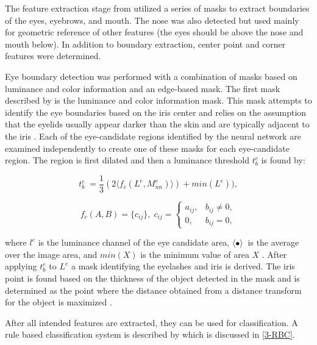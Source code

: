 The feature extraction stage from \cite{ioannou2007robust} utilized a series of masks to extract boundaries of the eyes, eyebrows, and mouth. The nose was also detected but used mainly for geometric reference of other features (the eyes should be above the nose and mouth below). In addition to boundary extraction, center point and corner features were determined. 

Eye boundary detection was performed with a combination of masks based on luminance and color information and an edge-based mask\cite{ioannou2007robust}. The first mask described by \cite{ioannou2007robust} is the luminance and color information mask. This mask attempts to identify the eye boundaries based on the iris center and relies on the assumption that the eyelids usually appear darker than the skin and are typically adjacent to the iris \cite{ioannou2007robust}. Each of the eye-candidate regions identified by the neural network are examined independently to create one of these masks for each eye-candidate region. The region is first dilated and then a luminance threshold $t^e_b$ is found by:

\begin{equation}
\label{eqn_lumThresh1}
t^e_b \; = \frac{1}{3}(2\langle f_c(L^e, M^e_{nn}) \rangle ) + min(L^e)),
\end{equation}


\begin{equation}
\label{eqn_integralImage2}
f_c(A,B) = \{c_{ij}\}, \; c_{ij} = \begin{cases}
a_{ij}, & b_{ij} \neq 0, \\ 
0, & b_{ij} = 0,
\end{cases}
\end{equation}

where $l^e$ is the luminance channel of the eye candidate area, $\langle \bullet \rangle\ $ is the average over the image area, and $min(X)$ is the minimum value of area $X$ \cite{ioannou2007robust}. After applying $t^e_b$ to $L^e$ a mask identifying the eyelashes and iris is derived. The iris point is found based on the thickness of the object detected in the mask and is determined as the point where the distance obtained from a distance transform for the object is maximized \cite{ioannou2007robust}.


After all intended features are extracted, they can be used for classification. A rule based classification system is described by \cite{ioannou2007robust} which is discussed in \ref{3-RBC}.


